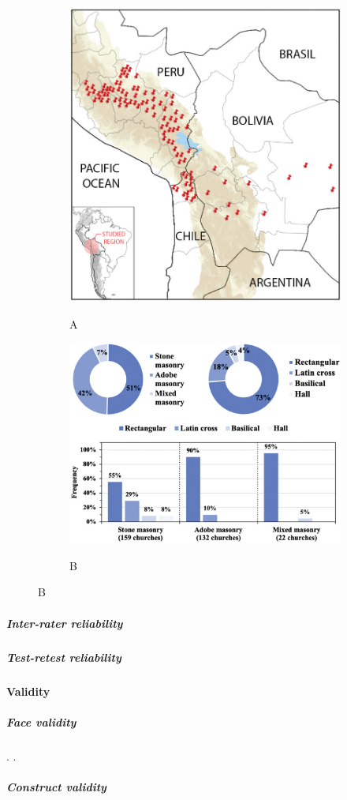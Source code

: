 \begin{figure}[ht]
  \caption{Figura con subfiguras}
  \label{fig:figura}
  \begin{subfigure}{0.35\textwidth}
      \centering
      \caption{A}
      \includegraphics[scale=0.28]{F_Figures/11_Chapter II/Cap2_Imagen2a.png}
      \label{fig:subfig1}
  \end{subfigure}
  \hfill
  \begin{subfigure}{0.55\textwidth}
      \centering
      \caption{B}
      \includegraphics[scale=0.28]{F_Figures/11_Chapter II/Cap2_Imagen2b.png}
      \label{fig:subfig2}
  \end{subfigure}
\end{figure}

\subparagraph{Inter-rater reliability}
\lipsum[10]

\subparagraph{Test-retest reliability}
\lipsum[11]

\paragraph{Validity}
\lipsum[12]

\subparagraph{Face validity}
\lipsum[13]. .

\subparagraph{Construct validity}
